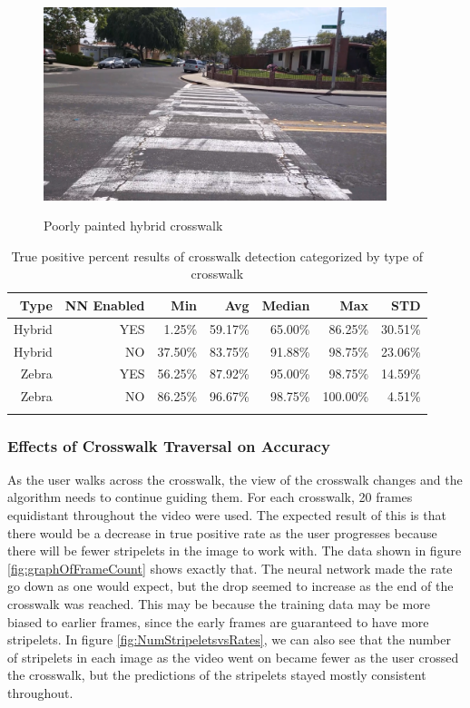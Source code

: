 \documentclass[12pt]{ucthesis}
\newcommand{\captionfonts}{\small\bf\ssp}
\begin{document}
\begin{figure}[t]
\begin{center}
\includegraphics[width=10cm]{PoorlyPaintedHybrid.png}
\captionfonts
\caption[Poorly Painted Hybrid Crosswalk]{Poorly painted hybrid crosswalk}
\label{fig:poorlyPaintedHybrid}
\end{center}
\end{figure}

\begin{table}[t]
    \begin{longtable}[t]{|r|r|r|r|r|r|r|}
    \hline
    Type & \multicolumn{1}{l|}{NN Enabled} & Min & Avg & Median & Max & STD \bigstrut\\
    \hline
    Hybrid & YES & 1.25\% & 59.17\% & 65.00\% & 86.25\% & 30.51\% \bigstrut\\
    \hline
    Hybrid & NO & 37.50\% & 83.75\% & 91.88\% & 98.75\% & 23.06\% \bigstrut\\
    \hline
    Zebra & YES & 56.25\% & 87.92\% & 95.00\% & 98.75\% & 14.59\% \bigstrut\\
    \hline
    Zebra & NO & 86.25\% & 96.67\% & 98.75\% & 100.00\% & 4.51\% \bigstrut\\
    \hline

    \caption{True positive percent results of crosswalk detection categorized by type of crosswalk}
    \label{tab:typeOfCwalk} 
    \end{longtable}
\end{table}

\subsubsection{Effects of Crosswalk Traversal on Accuracy}

As the user walks across the crosswalk, the view of the crosswalk changes and the algorithm needs to continue guiding them. For each crosswalk, 20 frames equidistant throughout the video were used. The expected result of this is that there would be a decrease in true positive rate as the user progresses because there will be fewer stripelets in the image to work with. The data shown in figure \ref{fig:graphOfFrameCount} shows exactly that. The neural network made the rate go down as one would expect, but the drop seemed to increase as the end of the crosswalk was reached. This may be because the training data may be more biased to earlier frames, since the early frames are guaranteed to have more stripelets. In figure \ref{fig:NumStripeletsvsRates}, we can also see that the number of stripelets in each image as the video went on became fewer as the user crossed the crosswalk, but the predictions of the stripelets stayed mostly consistent throughout. 
\end{document}
